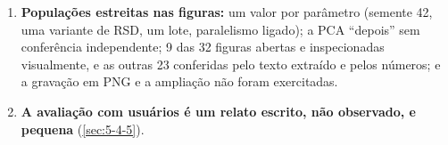\begin{enumerate}
\item \textbf{Populações estreitas nas figuras:} um valor por parâmetro (semente 42, uma variante de RSD, um lote, paralelismo ligado); a PCA ``depois'' sem conferência independente; 9 das 32 figuras abertas e inspecionadas visualmente, e as outras 23 conferidas pelo texto extraído e pelos números; e a gravação em PNG e a ampliação não foram exercitadas.
\item \textbf{A avaliação com usuários é um relato escrito, não observado, e pequena} (\ref{sec:5-4-5}).
\end{enumerate}


\endgroup
